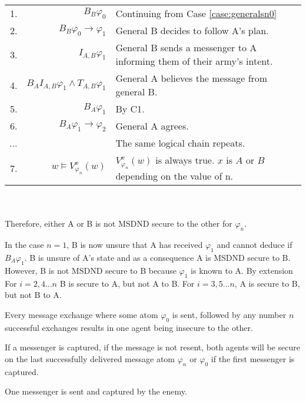 \begin{table}[]
\centering
\begin{tabular}{r r l}
1. & $B_{B} \varphi_0$ & Continuing from Case \ref{case:generalsn0} \\
2. & $B_{B} \varphi_0 \rightarrow \varphi_1$ & General B decides to follow A's plan. \\
3. & $I_{A,B} \varphi_1$ & General B sends a messenger to A informing them of their army's intent. \\
4. & $B_{A}I_{A,B} \varphi_1 \wedge T_{A,B} \varphi_1$ & General A believes the message from general B. \\
5. & $B_{A}\varphi_1$ & By C1. \\
6. & $B_{A}\varphi_1 \rightarrow \varphi_2$ & General A agrees. \\
...& & The same logical chain repeats. \\
7. & $w \vDash V_{\varphi_n}^{x}(w)$ & $V_{\varphi_n}^{x}(w)$ is always true. $x$ is $A$ or $B$ depending on the value of n. %
\end{tabular} \\~\\
Therefore, either A or B is not MSDND secure to the other for $\varphi_n$.
\label{tab:twoarmiesproof}
\end{table}

In the case $n=1$, B is now unsure that A has received $\varphi_1$ and cannot deduce if $B_{A} \varphi_1$. B is unsure of A's state and as a consequence A is MSDND secure to B. However, B is not MSDND secure to B because $\varphi_1$ is known to A. By extension For $i=2,4...n$ B is secure to A, but not A to B. For $i=3,5...n$, A is secure to B, but not B to A.

\begin{cor}
Every message exchange where some atom $\varphi_0$ is sent, followed by any number $n$ successful exchanges results in one agent being insecure to the other.
\end{cor}

\begin{thm}
If a messenger is captured, if the message is not resent, both agents will be secure on the last successfully delivered message atom $\varphi_{n}$ or $\varphi_0$ if the first messenger is captured.
\end{thm}

\begin{case}
One messenger is sent and captured by the enemy.
\end{case}

